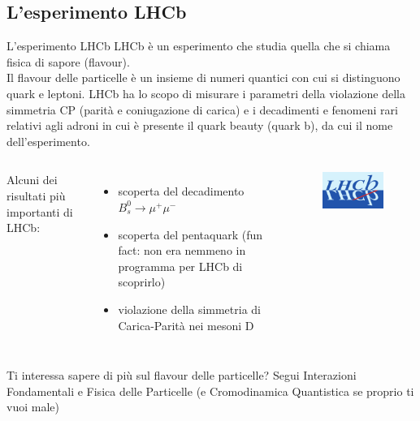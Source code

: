\documentclass[
10pt,
aspectratio=169,
]{beamer}
\begin{document}
\subsection{L'esperimento LHCb}
\begin{frame}{L'esperimento LHCb}
LHCb è un esperimento che studia quella che si chiama  fisica di sapore (flavour).\\
Il flavour delle particelle è un insieme di numeri quantici con cui si distinguono quark e leptoni.
\vfill
LHCb ha lo scopo di misurare i parametri della violazione della simmetria CP (parità e coniugazione di carica) e i decadimenti e fenomeni rari relativi agli adroni in cui è presente il quark beauty (quark b), da cui il nome dell'esperimento.  
\vfill
\begin{columns}
    Alcuni dei risultati più importanti di LHCb:
\begin{itemize}
    \item scoperta del decadimento ${\displaystyle B_{s}^{0}\to \mu ^{+}\mu ^{-}}$
\item scoperta del pentaquark (fun fact: non era nemmeno in programma per LHCb di scoprirlo)
\item violazione della simmetria di Carica-Parità nei mesoni D 
\end{itemize}
    \begin{figure}
        \centering
        \includegraphics[width=\textwidth]{Lhcb-logo-new.png}
    \end{figure}
\end{columns}
\vfill
Ti interessa sapere di più sul flavour delle particelle? Segui Interazioni Fondamentali e Fisica delle Particelle (e Cromodinamica Quantistica se proprio ti vuoi male)
\end{frame}
\end{document}
